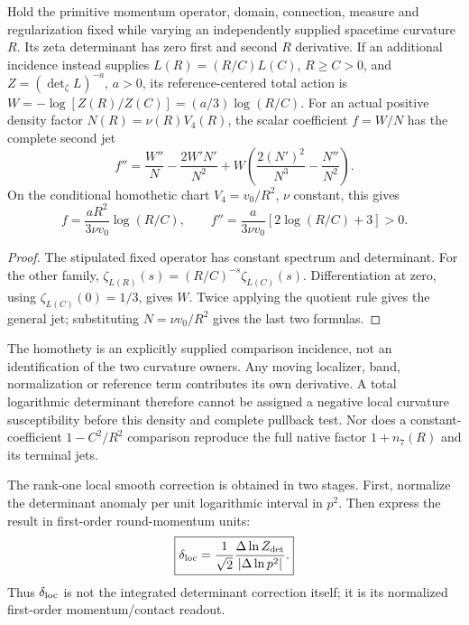 \documentclass[12pt,a4paper]{article}
\begin{document}
\begin{proposition}
\label{p3c:prop:v2217-determinant-density-jets}
Hold the primitive momentum operator, domain, connection, measure and
regularization fixed while varying an independently supplied spacetime
curvature $R$. Its zeta determinant has zero first and second $R$ derivative.
If an additional incidence instead supplies $L(R)=(R/C)L(C)$, $R\ge C>0$,
and $Z=(\det_\zeta L)^{-a}$, $a>0$, its reference-centered total action is
$W=-\log[Z(R)/Z(C)]=(a/3)\log(R/C)$.
For an actual positive density factor $N(R)=\nu(R)V_4(R)$, the scalar
coefficient $f=W/N$ has the complete second jet
\[
 f''=\frac{W''}{N}-\frac{2W'N'}{N^2}
             +W\left(\frac{2(N')^2}{N^3}-\frac{N''}{N^2}\right).
\]
On the conditional homothetic chart $V_4=v_0/R^2$, $\nu$ constant, this gives
\[
 f=\frac{aR^2}{3\nu v_0}\log(R/C),\qquad
 f''=\frac{a}{3\nu v_0}[2\log(R/C)+3]>0.
\]
\end{proposition}
\begin{proof}
The stipulated fixed operator has constant spectrum and determinant. For
the other family, $\zeta_{L(R)}(s)=(R/C)^{-s}\zeta_{L(C)}(s)$.
Differentiation at zero, using $\zeta_{L(C)}(0)=1/3$, gives $W$.
Twice applying the quotient rule gives the general jet; substituting
$N=\nu v_0/R^2$ gives the last two formulas.
\end{proof}
The homothety is an explicitly supplied comparison incidence, not an
identification of the two curvature owners. Any moving localizer, band,
normalization or reference term contributes its own derivative. A total
logarithmic determinant therefore cannot be assigned a negative local
curvature susceptibility before this density and complete pullback test.
Nor does a constant-coefficient $1-C^2/R^2$ comparison reproduce the full
native factor $1+n_7(R)$ and its terminal jets.


\begin{proposition}
\label{p3:prop:delta-reduction}
The rank-one local smooth correction is obtained in two stages.  First,
normalize the determinant anomaly per unit logarithmic interval in \(p^2\).
Then express the result in first-order round-momentum units:
\begin{equation}
\label{p3:eq:delta-reduction}
 \boxed{
 \delta_{\rm loc}
 =\frac1{\sqrt2}
  \frac{\Delta\ln Z_{\det}}{|\Delta\ln p^2|}.}
\end{equation}
Thus \(\delta_{\rm loc}\) is not the integrated determinant correction itself;
it is its normalized first-order momentum/contact readout.
\end{proposition}
\end{document}
